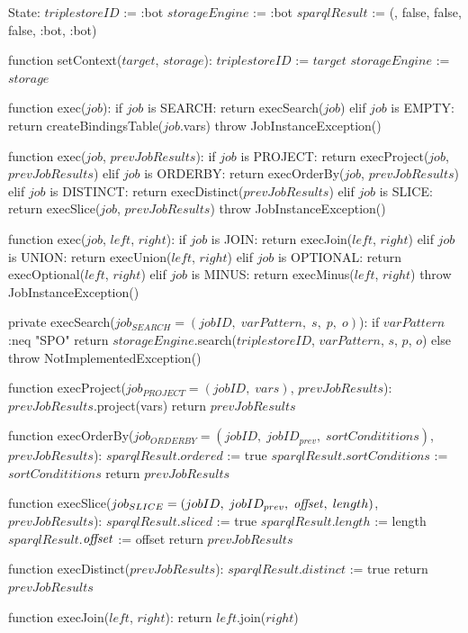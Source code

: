 State:
    $triplestoreID$ := :bot
    $storageEngine$ := :bot
    $sparqlResult$ := ({}, false, false, false, :bot, :bot)

function setContext($target$, $storage$):
    $triplestoreID$ := $target$
    $storageEngine$ := $storage$

function exec($job$):
    if $job$ is SEARCH:
        return execSearch($job$)
    elif $job$ is EMPTY:
        return createBindingsTable($job$.vars)
    throw JobInstanceException()

function exec($job$, $prevJobResults$):
    if $job$ is PROJECT:
        return execProject($job$, $prevJobResults$)
    elif $job$ is ORDERBY:
        return execOrderBy($job$, $prevJobResults$)
    elif $job$ is DISTINCT:
        return execDistinct($prevJobResults$)
    elif $job$ is SLICE:
        return execSlice($job$, $prevJobResults$)
    throw JobInstanceException()

function exec($job$, $left$, $right$):
    if $job$ is JOIN:
        return execJoin($left$, $right$)
    elif $job$ is UNION:
        return execUnion($left$, $right$)
    elif $job$ is OPTIONAL:
        return execOptional($left$, $right$)
    elif $job$ is MINUS:
        return execMinus($left$, $right$)
    throw JobInstanceException()

private execSearch($job_{SEARCH} = (jobID, \; varPattern, \; s, \; p, \; o)$):
    if $varPattern$ :neq "SPO"
        return $storageEngine$.search($triplestoreID$, $varPattern$, $s$, $p$, $o$)
    else
        throw NotImplementedException()

function execProject($job_{PROJECT} = (jobID, \; vars)$, $prevJobResults$):
    $prevJobResults$.project(vars)
    return $prevJobResults$

function execOrderBy($job_{ORDERBY} = (jobID, \; jobID_{prev}, \; sortCondititions)$, $prevJobResults$):
    $sparqlResult$.$ordered$ := true
    $sparqlResult$.$sortConditions$ := $sortCondititions$
    return $prevJobResults$

function execSlice($job_{SLICE} = (jobID, \; jobID_{prev}, \; \textrm{\textit{offset}}, \; length)$, $prevJobResults$):
    $sparqlResult$.$sliced$ := true
    $sparqlResult$.$length$ := length
    $sparqlResult$.$\textrm{\textit{offset}}$ := offset
    return $prevJobResults$

function execDistinct($prevJobResults$):
    $sparqlResult$.$distinct$ := true
    return $prevJobResults$

function execJoin($left$, $right$):
    return $left$.join($right$)

